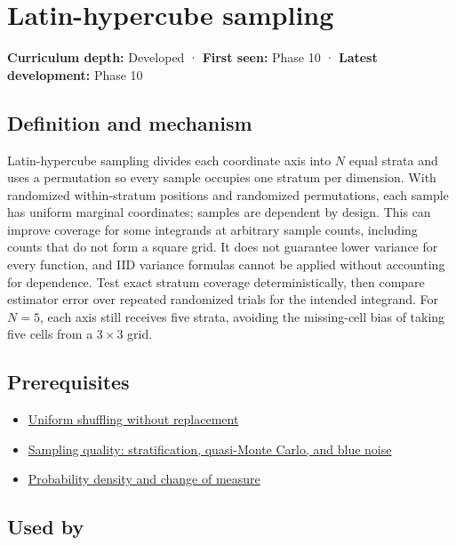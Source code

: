 \hypertarget{appendix-1c5e85693a06}{}\label{referencestart:appendix-1c5e85693a06}
\section{Latin-hypercube sampling}\label{appendix-1c5e85693a06-latin-hypercube-sampling}

\textbf{Curriculum depth:} Developed · \textbf{First seen:} Phase 10 · \textbf{Latest development:} Phase 10

\subsection{Definition and mechanism}\label{appendix-1c5e85693a06-definition-and-mechanism}

Latin-hypercube sampling divides each coordinate axis into \(N\) equal strata and uses a permutation so every sample occupies one stratum per dimension. With randomized within-stratum positions and randomized permutations, each sample has uniform marginal coordinates; samples are dependent by design. This can improve coverage for some integrands at arbitrary sample counts, including counts that do not form a square grid. It does not guarantee lower variance for every function, and IID variance formulas cannot be applied without accounting for dependence. Test exact stratum coverage deterministically, then compare estimator error over repeated randomized trials for the intended integrand. For \(N=5\), each axis still receives five strata, avoiding the missing-cell bias of taking five cells from a \(3\times3\) grid.

\subsection{Prerequisites}\label{appendix-1c5e85693a06-prerequisites}

\begin{itemize}
\tightlist
\item
  \hyperref[appendix-184fcc411663]{Uniform shuffling without replacement}
\item
  \hyperref[appendix-9f693ffd82bc]{Sampling quality: stratification, quasi-Monte Carlo, and blue noise}
\item
  \hyperref[appendix-4815cd87ab8b]{Probability density and change of measure}
\end{itemize}

\subsection{Used by}\label{appendix-1c5e85693a06-used-by}

